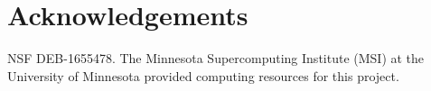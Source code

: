 \documentclass[11pt]{article}
\begin{document}
\clearpage





\section{Acknowledgements}

NSF DEB-1655478.
The Minnesota Supercomputing Institute (MSI) at the University of Minnesota provided computing resources for this project.


\clearpage


\setstretch{\stretchby}
\end{document}
